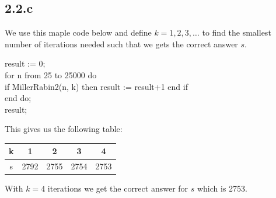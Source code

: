 \documentclass[11pt]{report}
\begin{document}
\subsection*{2.2.c}
We use this maple code below and define $k = 1,2,3,\dots$ to find the smallest number of iterations needed such that we gets the correct answer $s$.
\begin{mapleinput}
result := 0; \\
for n from 25 to 25000 do \\
if MillerRabin2(n, k) then result := result+1 end if \\
end do; \\
result;
\end{mapleinput}
This gives us the following table:
\begin{center}
\begin{tabular}{| c | c | c | c | c |}
\hline
k & 1 & 2 & 3 & 4 \\ \hline
s & 2792 & 2755 & 2754 & 2753 \\ \hline
\end{tabular}
\end{center}
With $k = 4$ iterations we get the correct answer for $s$ which is 2753.
\end{document}
